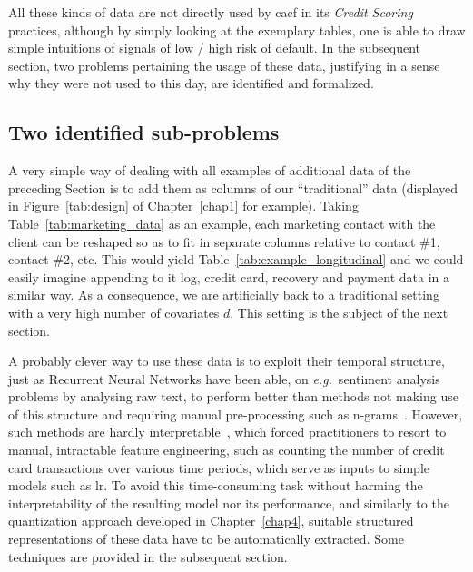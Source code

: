 All these kinds of data are not directly used by \gls{cacf} in its \textit{Credit Scoring} practices, although by simply looking at the exemplary tables, one is able to draw simple intuitions of signals of low / high risk of default. In the subsequent section, two problems pertaining the usage of these data, justifying in a sense why they were not used to this day, are identified and formalized.


\subsection{Two identified sub-problems}

A very simple way of dealing with all examples of additional data of the preceding Section is to add them as columns of our ``traditional'' data (displayed in Figure~\ref{tab:design} of Chapter~\ref{chap1} for example). Taking Table~\ref{tab:marketing_data} as an example, each marketing contact with the client can be reshaped so as to fit in separate columns relative to contact \#1, contact \#2, etc. This would yield Table~\ref{tab:example_longitudinal} and we could easily imagine appending to it log, credit card, recovery and payment data in a similar way. As a consequence, we are artificially back to a traditional setting with a very high number of covariates $d$. This setting is the subject of the next section. 

A probably clever way to use these data is to exploit their temporal structure, just as Recurrent Neural Networks have been able, on \textit{e.g.}\ sentiment analysis problems by analysing raw text, to perform better than methods not making use of this structure and requiring manual pre-processing such as n-grams~\cite{manning1999foundations}. However, such methods are hardly interpretable~\cite{lou2012intelligible}, which forced practitioners to resort to manual, intractable feature engineering, such as counting the number of credit card transactions over various time periods, which serve as inputs to simple models such as \gls{lr}. To avoid this time-consuming task without harming the interpretability of the resulting model nor its performance, and similarly to the quantization approach developed in Chapter~\ref{chap4}, suitable structured representations of these data have to be automatically extracted. Some techniques are provided in the subsequent section.

